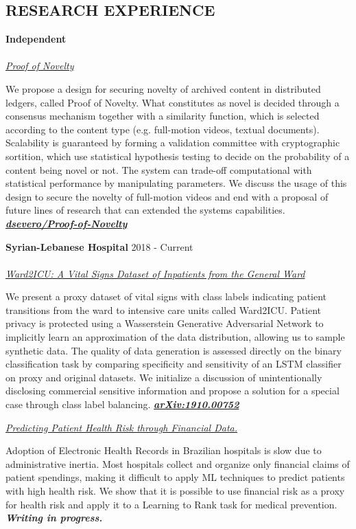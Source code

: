 \documentclass[margin, line]{res}
\begin{document}
\begin{resume}
\section{RESEARCH EXPERIENCE}
\textbf{Independent}\\
\\
\underline{\sl Proof of Novelty}\\
\begin{small}
    We propose a design for securing novelty of archived content in distributed ledgers, called Proof of Novelty. What constitutes as novel is decided through a consensus mechanism together with a similarity function, which is selected according to the content type (e.g. full-motion videos, textual documents). Scalability is guaranteed by forming a validation committee with cryptographic sortition, which use statistical hypothesis testing to decide on the probability of a content being novel or not. The system can trade-off computational with statistical performance by manipulating parameters. We discuss the usage of this design to secure the novelty of full-motion videos and end with a proposal of future lines of research that can extended the systems capabilities. \href{https://github.com/dsevero/Proof-of-Novelty}{\sl \textbf{dsevero/Proof-of-Novelty}}
\end{small}
\newpage
\textbf{Syrian-Lebanese Hospital} \hfill 2018 - Current\\
\\
\underline{\sl Ward2ICU: A Vital Signs Dataset of Inpatients from the General Ward}\\
\begin{small}
    We present a proxy dataset of vital signs with class labels indicating patient transitions from the ward to intensive care units called Ward2ICU. Patient privacy is protected using a Wasserstein Generative Adversarial Network to implicitly learn an approximation of the data distribution, allowing us to sample synthetic data. The quality of data generation is assessed directly on the binary classification task by comparing specificity and sensitivity of an LSTM classifier on proxy and original datasets. We initialize a discussion of unintentionally disclosing commercial sensitive information and propose a solution for a special case through class label balancing. \href{https://arxiv.org/abs/1910.00752}{\sl \textbf{arXiv:1910.00752}}
\end{small}

\underline{\sl Predicting Patient Health Risk through Financial Data.}\\
\begin{small}
    Adoption of Electronic Health Records in Brazilian hospitals is slow due to administrative inertia. Most hospitals collect and organize only financial claims of patient spendings, making it difficult to apply ML techniques to predict patients with high health risk. We show that it is possible to use financial risk as a proxy for health risk and apply it to a Learning to Rank task for medical prevention. {\sl \textbf{Writing in progress.}}
\end{small}


\end{resume}
\end{document}

